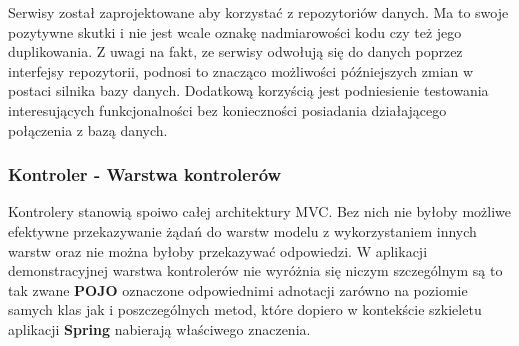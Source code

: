 			Serwisy został zaprojektowane aby korzystać z repozytoriów danych. Ma to swoje pozytywne skutki
			i nie jest wcale oznakę nadmiarowości kodu czy też jego duplikowania. Z uwagi na fakt, ze serwisy
			odwołują się do danych poprzez interfejsy repozytorii, podnosi to znacząco możliwości 
			późniejszych zmian w postaci silnika bazy danych. Dodatkową korzyścią jest podniesienie testowania
			interesujących funkcjonalności bez konieczności posiadania działającego połączenia z bazą danych.
		\subsubsection{Kontroler - Warstwa kontrolerów}
			Kontrolery stanowią spoiwo całej architektury MVC. Bez nich nie byłoby możliwe efektywne przekazywanie żądań do warstw modelu z wykorzystaniem
			innych warstw oraz nie można byłoby przekazywać odpowiedzi. W aplikacji demonstracyjnej warstwa kontrolerów nie wyróżnia się niczym szczególnym
			są to tak zwane \textbf{POJO} oznaczone odpowiednimi adnotacji zarówno na poziomie samych klas jak i poszczególnych metod, które dopiero
			w kontekście szkieletu aplikacji \textbf{Spring} nabierają właściwego znaczenia.
